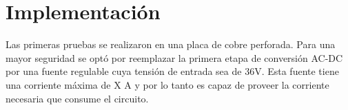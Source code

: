 \section{Implementación}

Las primeras pruebas se realizaron en una placa de cobre perforada. 
Para una mayor seguridad se optó por reemplazar la primera etapa de conversión AC-DC por una fuente regulable cuya tensión de entrada sea de 36V.
Esta fuente tiene una corriente máxima de X A y por lo tanto es capaz de proveer la corriente necesaria que consume el circuito.